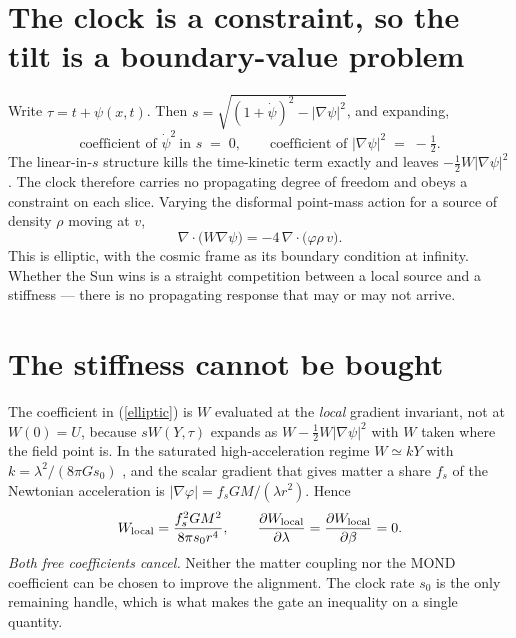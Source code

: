 \documentclass[11pt,letterpaper]{article}
\begin{document}
\section{The clock is a constraint, so the tilt is a boundary-value problem}
Write $\tau=t+\psi(x,t)$. Then $s=\sqrt{(1+\dot\psi)^2-|\nabla\psi|^2}$, and expanding,
\begin{equation}
\text{coefficient of }\dot\psi^2\ \text{in } s\;=\;0,\qquad \text{coefficient of }|\nabla\psi|^2\;=\;-\tfrac12 .
\end{equation}
The linear-in-$s$ structure kills the time-kinetic term exactly and leaves $-\tfrac12W|\nabla\psi|^2$. The clock therefore carries no propagating degree of freedom and obeys a constraint on each slice. Varying the disformal point-mass action for a source of density $\rho$ moving at $v$,
\begin{equation}
\nabla\!\cdot\!\big(W\nabla\psi\big)=-4\,\nabla\!\cdot\!\big(\varphi\rho\,v\big).
\label{elliptic}
\end{equation}
This is elliptic, with the cosmic frame as its boundary condition at infinity. Whether the Sun wins is a straight competition between a local source and a stiffness --- there is no propagating response that may or may not arrive.

\section{The stiffness cannot be bought}
The coefficient in (\ref{elliptic}) is $W$ evaluated at the \emph{local} gradient invariant, not at $W(0)=U$, because $sW(Y,\tau)$ expands as $W-\tfrac12W|\nabla\psi|^2$ with $W$ taken where the field point is. In the saturated high-acceleration regime $W\simeq kY$ with $k=\lambda^2/(8\pi Gs_0)$ \cite{paper24}, and the scalar gradient that gives matter a share $f_s$ of the Newtonian acceleration is $|\nabla\varphi|=f_sGM/(\lambda r^2)$. Hence
\begin{equation}
W_{\rm local}=\frac{f_s^2GM^2}{8\pi s_0r^4},\qquad \frac{\partial W_{\rm local}}{\partial\lambda}=\frac{\partial W_{\rm local}}{\partial\beta}=0 .
\end{equation}
\emph{Both free coefficients cancel.} Neither the matter coupling nor the MOND coefficient can be chosen to improve the alignment. The clock rate $s_0$ is the only remaining handle, which is what makes the gate an inequality on a single quantity.
\end{document}
